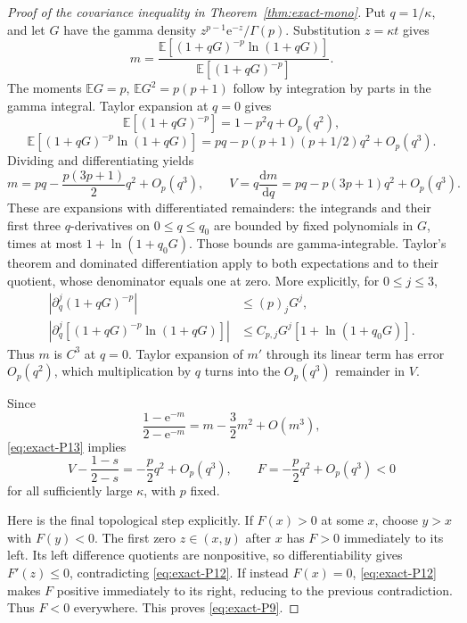 \begin{proof}[Proof of the covariance inequality in Theorem~\ref{thm:exact-mono}]
Put \(q=1/\kappa\), and let \(G\) have the gamma density
\(z^{p-1}\mathrm{e}^{-z}/\Gamma(p)\). Substitution \(z=\kappa t\) gives
\begin{equation}
 m=\frac{\mathbb{E}[(1+qG)^{-p}\ln(1+qG)]}{\mathbb{E}[(1+qG)^{-p}]}.
\end{equation}
The moments \(\mathbb{E}G=p\), \(\mathbb{E}G^2=p(p+1)\) follow by integration by parts in the gamma integral. Taylor expansion at \(q=0\) gives
\begin{equation}
 \mathbb{E}[(1+qG)^{-p}]=1-p^2q+O_p(q^2),
\end{equation}
\begin{equation}
 \mathbb{E}[(1+qG)^{-p}\ln(1+qG)]
 =pq-p(p+1)(p+1/2)q^2+O_p(q^3).
\end{equation}
Dividing and differentiating yields
\begin{equation}
 m=pq-\frac{p(3p+1)}2q^2+O_p(q^3),\qquad
 V=q\frac{\mathrm{d}m}{\mathrm{d}q}=pq-p(3p+1)q^2+O_p(q^3).             \label{eq:exact-P13}
\end{equation}
These are expansions with differentiated remainders: the integrands and their first three \(q\)-derivatives on \(0\le q\le q_0\) are bounded by fixed polynomials in \(G\), times at most \(1+\ln(1+q_0G)\). Those bounds are gamma-integrable. Taylor's theorem and dominated differentiation apply to both expectations and to their quotient, whose denominator equals one at zero. More explicitly, for $0\leq j\leq3$,
\begin{equation}
 \begin{split}
 |\partial_q^j(1+qG)^{-p}|&\leq(p)_jG^j,\\
 |\partial_q^j[(1+qG)^{-p}\ln(1+qG)]|
 &\leq C_{p,j}G^j[1+\ln(1+q_0G)].
 \end{split}\label{eq:exact-gamma-domination}
\end{equation}
Thus $m$ is $C^3$ at $q=0$. Taylor expansion of $m'$ through its linear term has error $O_p(q^2)$, which multiplication by $q$ turns into the $O_p(q^3)$ remainder in $V$.

Since
\begin{equation}
 \frac{1-\mathrm{e}^{-m}}{2-\mathrm{e}^{-m}}=m-\frac32m^2+O(m^3),
\end{equation}
\eqref{eq:exact-P13} implies
\begin{equation}
 V-\frac{1-s}{2-s}=-\frac p2q^2+O_p(q^3),
 \qquad F=-\frac p2q^2+O_p(q^3)<0                   \label{eq:exact-P14}
\end{equation}
for all sufficiently large \(\kappa\), with \(p\) fixed.

Here is the final topological step explicitly. If \(F(x)>0\) at some \(x\), choose \(y>x\) with \(F(y)<0\). The first zero \(z\in(x,y)\) after \(x\) has \(F>0\) immediately to its left. Its left difference quotients are nonpositive, so differentiability gives \(F'(z)\le0\), contradicting \eqref{eq:exact-P12}. If instead \(F(x)=0\), \eqref{eq:exact-P12} makes \(F\) positive immediately to its right, reducing to the previous contradiction. Thus \(F<0\) everywhere. This proves \eqref{eq:exact-P9}. \end{proof}

